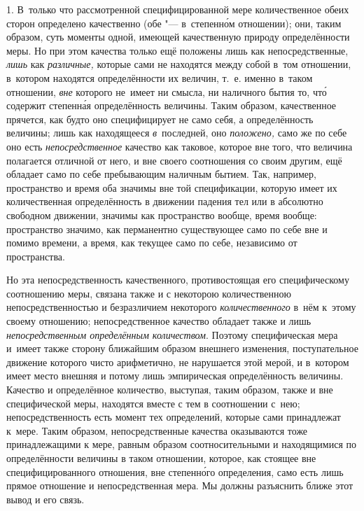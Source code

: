 
1. В~только что рассмотренной специфицированной мере количественное обеих
сторон определено качественно (обе "--- в~степенн\'{о}м отношении); они, таким
образом, суть моменты одной, имеющей качественную природу определённости меры.
Но при этом качества только ещё положены лишь как непосредственные, {\em лишь}
как {\em различные,} которые сами не находятся между собой в~том отношении,
в~котором находятся определённости их величин, т.~е. именно в~таком отношении,
{\em вне} которого не~имеет ни смысла, ни наличного бытия то, чт\'{о} содержит
степенн\'{а}я определённость величины. Таким образом, качественное прячется,
как будто оно специфицирует не само себя, а определённость величины; лишь как
находящееся {\em в}~последней, оно {\em положено,} само же по себе оно есть
{\em непосредственное} качество как таковое, которое вне того, что величина
полагается отличной от него, и вне своего соотношения со своим другим, ещё
обладает само по себе пребывающим наличным бытием. Так, например, пространство
и время оба значимы вне той спецификации, которую имеет их количественная
определённость в движении падения тел или в абсолютно свободном движении,
значимы как пространство вообще, время вообще: пространство значимо, как
перманентно существующее само по себе вне и помимо времени, а время, как
текущее само по себе, независимо от пространства.

Но эта непосредственность качественного, противостоящая его специфическому
соотношению меры, связана также и с некоторою количественною
непосредственностью и безразличием некоторого {\em количественного} в~нём
к~этому своему отношению; непосредственное качество обладает также и лишь
{\em непосредственным определённым количеством}. Поэтому специфическая мера
и~имеет также сторону ближайшим образом внешнего изменения, поступательное
движение которого чисто арифметично, не нарушается этой мерой, и в~котором
имеет место внешняя и потому лишь эмпирическая определённость величины.
Качество и определённое количество, выступая, таким образом, также и вне
специфической меры, находятся вместе с тем в соотношении с~нею;
непосредственность есть момент тех определений, которые сами принадлежат
к~мере. Таким образом, непосредственные качества оказываются тоже
принадлежащими к мере, равным образом соотносительными и находящимися по
определённости величины в таком отношении, которое, как стоящее вне
специфицированного отношения, вне степенн\'{о}го определения, само есть лишь
прямое отношение и непосредственная мера. Мы должны разъяснить ближе этот
вывод и его связь.

